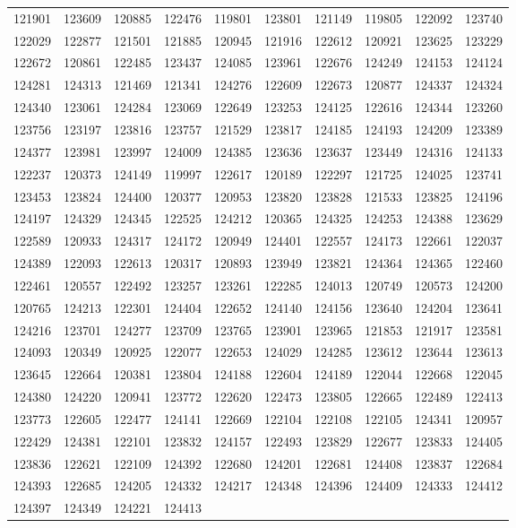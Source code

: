 {\begin{longtable}{rrrrrrrrrr}
121901 & 123609 & 120885 & 122476 & 119801 & 123801 & 121149 & 119805 & 122092 & 123740\\
122029 & 122877 & 121501 & 121885 & 120945 & 121916 & 122612 & 120921 & 123625 & 123229\\
122672 & 120861 & 122485 & 123437 & 124085 & 123961 & 122676 & 124249 & 124153 & 124124\\
124281 & 124313 & 121469 & 121341 & 124276 & 122609 & 122673 & 120877 & 124337 & 124324\\
124340 & 123061 & 124284 & 123069 & 122649 & 123253 & 124125 & 122616 & 124344 & 123260\\
123756 & 123197 & 123816 & 123757 & 121529 & 123817 & 124185 & 124193 & 124209 & 123389\\
124377 & 123981 & 123997 & 124009 & 124385 & 123636 & 123637 & 123449 & 124316 & 124133\\
122237 & 120373 & 124149 & 119997 & 122617 & 120189 & 122297 & 121725 & 124025 & 123741\\
123453 & 123824 & 124400 & 120377 & 120953 & 123820 & 123828 & 121533 & 123825 & 124196\\
124197 & 124329 & 124345 & 122525 & 124212 & 120365 & 124325 & 124253 & 124388 & 123629\\
122589 & 120933 & 124317 & 124172 & 120949 & 124401 & 122557 & 124173 & 122661 & 122037\\
124389 & 122093 & 122613 & 120317 & 120893 & 123949 & 123821 & 124364 & 124365 & 122460\\
122461 & 120557 & 122492 & 123257 & 123261 & 122285 & 124013 & 120749 & 120573 & 124200\\
120765 & 124213 & 122301 & 124404 & 122652 & 124140 & 124156 & 123640 & 124204 & 123641\\
124216 & 123701 & 124277 & 123709 & 123765 & 123901 & 123965 & 121853 & 121917 & 123581\\
124093 & 120349 & 120925 & 122077 & 122653 & 124029 & 124285 & 123612 & 123644 & 123613\\
123645 & 122664 & 120381 & 123804 & 124188 & 122604 & 124189 & 122044 & 122668 & 122045\\
124380 & 124220 & 120941 & 123772 & 122620 & 122473 & 123805 & 122665 & 122489 & 122413\\
123773 & 122605 & 122477 & 124141 & 122669 & 122104 & 122108 & 122105 & 124341 & 120957\\
122429 & 124381 & 122101 & 123832 & 124157 & 122493 & 123829 & 122677 & 123833 & 124405\\
123836 & 122621 & 122109 & 124392 & 122680 & 124201 & 122681 & 124408 & 123837 & 122684\\
124393 & 122685 & 124205 & 124332 & 124217 & 124348 & 124396 & 124409 & 124333 & 124412\\
124397 & 124349 & 124221 & 124413 & & & & & &\\
\end{longtable}}

